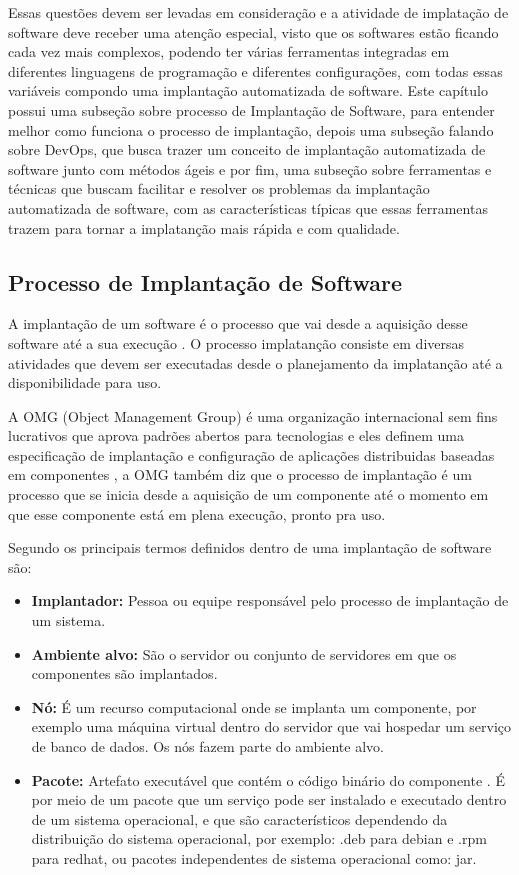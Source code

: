 Essas questões  devem ser levadas em consideração e a atividade de implatação de
software deve receber uma atenção especial, visto que os softwares estão ficando
cada vez mais complexos, podendo ter várias ferramentas integradas em diferentes
linguagens de programação e diferentes configurações, com todas essas variáveis compondo
uma implantação automatizada de software. Este capítulo possui uma subseção sobre
processo de Implantação de Software, para entender melhor como funciona o processo de implantação,
depois uma subseção falando sobre DevOps, que busca trazer um conceito de implantação
automatizada de software junto com métodos ágeis e por fim, uma subseção sobre
ferramentas e técnicas que buscam facilitar e resolver os problemas da
implantação automatizada de software, com as características típicas que essas
ferramentas trazem para tornar a implatanção mais rápida e com qualidade.

\subsection{Processo de Implantação de Software}

A implantação de um software é o processo que vai desde a aquisição desse software
até a sua execução \cite{leo2014}. O processo implatanção consiste em diversas
atividades que devem ser executadas desde o planejamento da implatanção até a
disponibilidade para uso.

A OMG (Object Management Group) é uma organização internacional sem fins lucrativos
que aprova padrões abertos para tecnologias e eles definem uma especificação de
implantação e configuração de aplicações distribuidas baseadas em componentes \cite{omg2006},
a OMG também diz que o processo de implantação é um processo que se inicia desde
a aquisição de um componente até o momento em que esse componente está em plena
execução, pronto pra uso.

Segundo \cite{omg2006} os principais termos definidos dentro de uma implantação
de software são:

\begin{itemize}
  \item  \textbf{Implantador:} Pessoa ou equipe responsável pelo processo de
  implantação  de um sistema.
  \item  \textbf{Ambiente alvo:} São o servidor ou conjunto de servidores em
  que os componentes são implantados.
  \item  \textbf{Nó:} É um recurso computacional onde se implanta um componente,
  por exemplo uma máquina virtual dentro do servidor que vai hospedar um serviço
  de banco de dados. Os nós fazem parte do ambiente alvo.
  \item  \textbf{Pacote:} Artefato executável que contém o código binário do componente
  . É por meio de um pacote que um serviço pode ser instalado e executado dentro
  de um sistema operacional, e que são característicos dependendo da distribuição
  do sistema operacional, por exemplo: .deb para debian e .rpm para redhat, ou
  pacotes independentes de sistema operacional como: jar.
\end{itemize}

